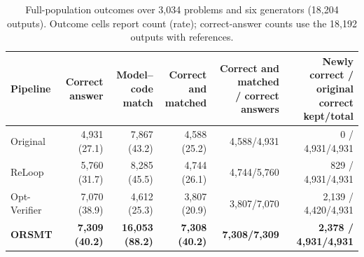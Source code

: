 \begin{table}[htbp]
\caption{Full-population outcomes over 3,034 problems and six generators (18,204 outputs). Outcome cells report count (rate); correct-answer counts use the 18,192 outputs with references.}
\label{tab:nativepipelines}
\centering\footnotesize\setlength{\tabcolsep}{1.0pt}
\begin{tabular*}{\textwidth}{@{\extracolsep{\fill}}lrrrrr@{}}
\toprule
Pipeline & \shortstack{Correct\\answer} & \shortstack{Model--code\\match} & \shortstack{Correct and\\matched} & \shortstack{Correct and matched\\/ correct answers} & \shortstack{Newly correct / original\\correct kept/total}\\
\midrule
Original & 4,931 (27.1) & 7,867 (43.2) & 4,588 (25.2) & 4,588/4,931 & 0 / 4,931/4,931\\
ReLoop & 5,760 (31.7) & 8,285 (45.5) & 4,744 (26.1) & 4,744/5,760 & 829 / 4,931/4,931\\
Opt-Verifier & 7,070 (38.9) & 4,612 (25.3) & 3,807 (20.9) & 3,807/7,070 & 2,139 / 4,420/4,931\\
\textbf{ORSMT} & \textbf{7,309 (40.2)} & \textbf{16,053 (88.2)} & \textbf{7,308 (40.2)} & \textbf{7,308/7,309} & \textbf{2,378 / 4,931/4,931}\\
\bottomrule
\end{tabular*}
\end{table}

